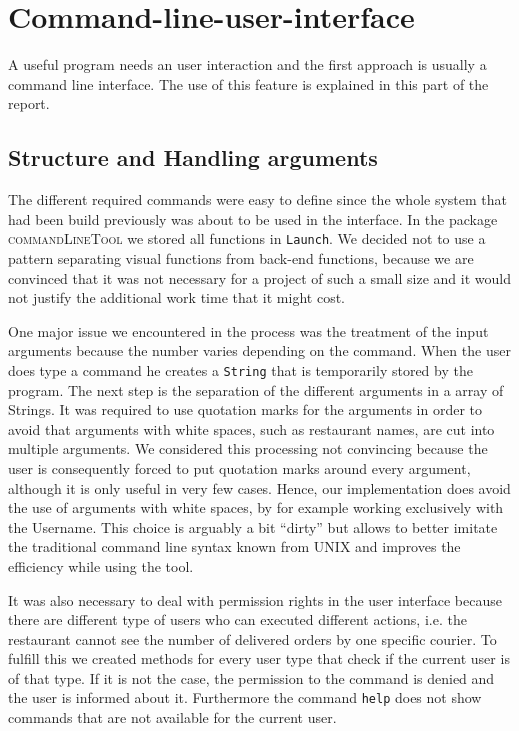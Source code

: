 \section{Command-line-user-interface}
\label{sec:command_line_user_interface}

A useful program needs an user interaction and the first approach is usually a command line 
interface. The use of this feature is explained in this part of the report.

\subsection{Structure and Handling arguments}
\label{sub:structure_and_handling_arguments}

The different required commands were easy to define since the whole system that had been build 
previously was about to be used in the interface. In the package \textsc{commandLineTool} we 
stored all functions in \lstinline|Launch|. We decided not to use a pattern separating
visual functions from back-end functions, because we are convinced that it was not necessary for a
project of such a small size and it would not justify the additional work time that it might 
cost.

One major issue we encountered in the process was the treatment of the input arguments because 
the number varies depending on the command. When the user does type a command he creates a 
\lstinline|String| that is temporarily stored by the program. The next step is the separation of 
the different arguments in a array of Strings. It was required to use quotation marks for the 
arguments in order to avoid that arguments with white spaces, such as restaurant names,  are cut
into multiple arguments.
We considered this processing not convincing because the user is consequently forced to put 
quotation marks around every argument, although it is only useful in very few cases. Hence, 
our implementation does avoid the use of arguments with white spaces, by for example working 
exclusively with the Username. This choice is arguably a bit ``dirty'' but allows to better 
imitate the traditional command line syntax known from \textsc{UNIX} and improves the efficiency 
while using the tool.

It was also necessary to deal with permission rights in the user interface because there are 
different type of users who can executed different actions, i.e. the restaurant cannot see
the number of delivered orders by one specific courier. To fulfill this we created methods for
every user type that check if the current user is of that type. If it is not the case, the 
permission to the command is denied and the user is informed about it. Furthermore the 
command \lstinline|help| does not show commands that are not available for the current user.

